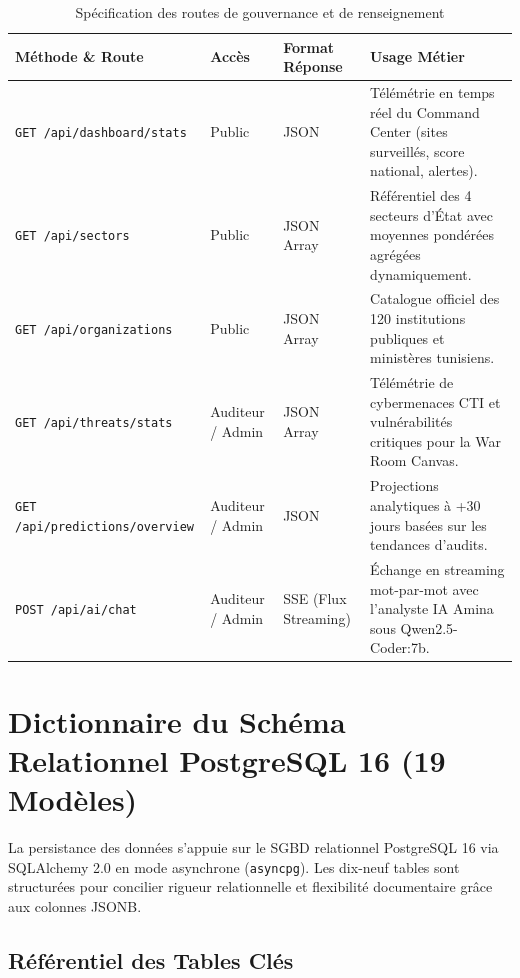 \begin{table}[!htbp]
\centering
\caption{Spécification des routes de gouvernance et de renseignement}
\label{tab:api_gov}
\begin{singlespace}
\footnotesize
\renewcommand{\arraystretch}{1.1}
\begin{tabularx}{\textwidth}{p{3.5cm} l p{2.8cm} X}
\toprule
\textbf{Méthode \& Route} & \textbf{Accès} & \textbf{Format Réponse} & \textbf{Usage Métier} \\
\midrule
\texttt{GET /api/dashboard/stats} & Public & JSON & Télémétrie en temps réel du Command Center (sites surveillés, score national, alertes). \\
\texttt{GET /api/sectors} & Public & JSON Array & Référentiel des 4 secteurs d'État avec moyennes pondérées agrégées dynamiquement. \\
\texttt{GET /api/organizations} & Public & JSON Array & Catalogue officiel des 120 institutions publiques et ministères tunisiens. \\
\texttt{GET /api/threats/stats} & Auditeur / Admin & JSON Array & Télémétrie de cybermenaces CTI et vulnérabilités critiques pour la War Room Canvas. \\
\texttt{GET /api/predictions/overview} & Auditeur / Admin & JSON & Projections analytiques à +30 jours basées sur les tendances d'audits. \\
\texttt{POST /api/ai/chat} & Auditeur / Admin & SSE (Flux Streaming) & Échange en streaming mot-par-mot avec l'analyste IA Amina sous Qwen2.5-Coder:7b. \\
\bottomrule
\end{tabularx}
\end{singlespace}
\end{table}

\chapter[Schéma Relationnel PostgreSQL]{Dictionnaire du Schéma Relationnel PostgreSQL 16 (19 Modèles)}
\label{anx:db}

La persistance des données s'appuie sur le SGBD relationnel PostgreSQL 16 via SQLAlchemy 2.0 en mode asynchrone (\texttt{asyncpg}). Les dix-neuf tables sont structurées pour concilier rigueur relationnelle et flexibilité documentaire grâce aux colonnes JSONB.

\section{Référentiel des Tables Clés}

